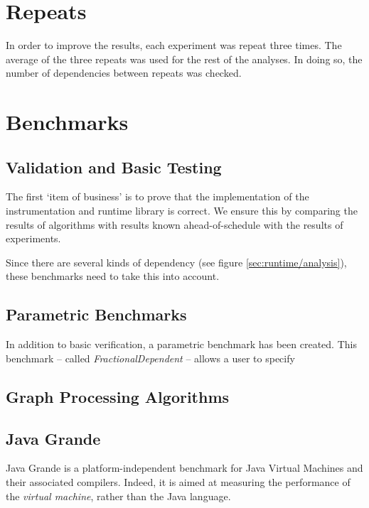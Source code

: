 \section{Repeats} \label{sec:methodology/repeats}
In order to improve the results, each experiment was repeat three times. The average of the three repeats was used for the rest of the analyses. In doing so, the number of dependencies between repeats was checked.

\section{Benchmarks} \label{sec:methodology/benchmarks}
	\subsection{Validation and Basic Testing} \label{sec:methodology/benchmarks/simple}
	The first `item of business' is to prove that the implementation of the instrumentation and runtime library is correct. We ensure this by comparing the results of algorithms with results known ahead-of-schedule with the results of experiments.
	
	Since there are several kinds of dependency (see figure \ref{sec:runtime/analysis}), these benchmarks need to take this into account.
	
	\subsection{Parametric Benchmarks} \label{sec:methodology/benchmarks/parametric}
	In addition to basic verification, a parametric benchmark has been created. This benchmark -- called \textit{FractionalDependent} -- allows a user to specify 
	
	\subsection{Graph Processing Algorithms} \label{sec:methodology/benchmarks/graphs}
	
	\subsection{Java Grande} \label{sec:methodology/benchmarks/grande}
	Java Grande \citep{Smith2001,Bull2001} is a platform-independent benchmark for Java Virtual Machines and their associated compilers. Indeed, it is aimed at measuring the performance of the \emph{virtual machine}, rather than the Java language.
	
